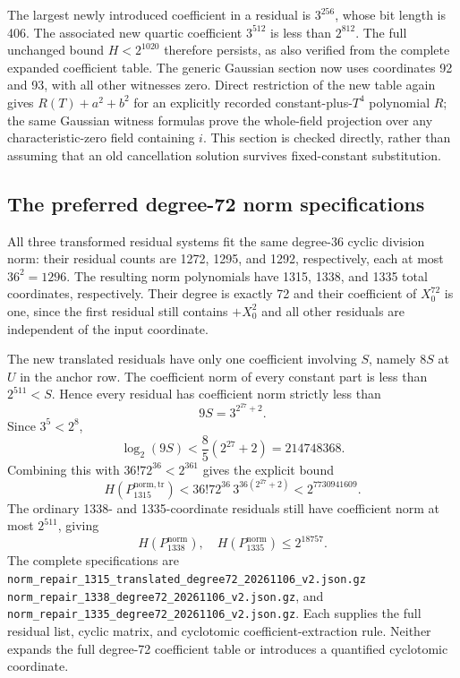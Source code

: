 \documentclass[11pt]{article}
\theoremstyle{definition}
\begin{document}
The largest newly introduced coefficient in a residual is
$3^{256}$, whose bit length is 406.  The associated new
quartic coefficient $3^{512}$ is less than $2^{812}$.
The full unchanged bound $H<2^{1020}$ therefore persists,
as also verified from the complete expanded coefficient
table.  The generic Gaussian section now uses coordinates
92 and 93, with all other witnesses zero.  Direct restriction
of the new table again gives $R(T)+a^2+b^2$ for an explicitly
recorded constant-plus-$T^4$ polynomial $R$; the same Gaussian
witness formulas prove the whole-field projection over any
characteristic-zero field containing $i$.  This section is
checked directly, rather than assuming that an old
cancellation solution survives fixed-constant substitution.

\subsection{The preferred degree-72 norm specifications}

All three transformed residual systems fit the same degree-36
cyclic division norm: their residual counts are 1272, 1295,
and 1292, respectively, each at most $36^2=1296$.
The resulting norm polynomials have 1315, 1338, and 1335 total
coordinates, respectively.  Their degree is exactly 72 and
their coefficient of $X_0^{72}$ is one, since the first
residual still contains $+X_0^2$ and all other residuals
are independent of the input coordinate.

The new translated residuals have only one coefficient
involving $S$, namely $8S$ at $U$ in the anchor row.  The
coefficient norm of every constant part is less than
$2^{511}<S$.  Hence every residual has coefficient norm
strictly less than
\[
                            9S=3^{2^{27}+2}.
\]
Since $3^5<2^8$,
\[
               \log_2(9S)<\frac85(2^{27}+2)=214748368.
\]
Combining this with $36!72^{36}<2^{361}$ gives the explicit
bound
\[
 H(P_{1315}^{\mathrm{norm,tr}})
    <36!72^{36}\,3^{36(2^{27}+2)}
    <2^{7730941609}.
\]
The ordinary 1338- and 1335-coordinate residuals still have coefficient
norm at most $2^{511}$, giving
\[
                       H(P_{1338}^{\mathrm{norm}}),\quad
                       H(P_{1335}^{\mathrm{norm}})
                                         \le2^{18757}.
\]
The complete specifications are
\nolinkurl{norm_repair_1315_translated_degree72_20261106_v2.json.gz}
\nolinkurl{norm_repair_1338_degree72_20261106_v2.json.gz},
and
\nolinkurl{norm_repair_1335_degree72_20261106_v2.json.gz}.
Each supplies the full residual list, cyclic matrix, and
cyclotomic coefficient-extraction rule.  Neither expands
the full degree-72 coefficient table or introduces a
quantified cyclotomic coordinate.
\end{document}
